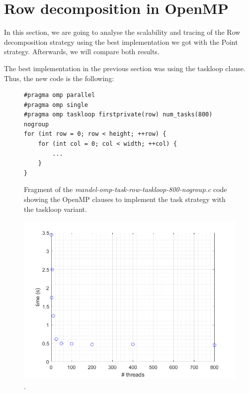 \documentclass[12pt, a4paper]{article}
\begin{document}
\section{Row decomposition in OpenMP}

In this section, we are going to analyse the scalability and tracing of the Row decomposition strategy using the best implementation we got with the Point strategy. Afterwards, we will compare both results.

The best implementation in the previous section was using the taskloop clause. Thus, the new code is the following:

\begin{figure}[H]
\begin{lstlisting}
#pragma omp parallel
#pragma omp single
#pragma omp taskloop firstprivate(row) num_tasks(800) nogroup
for (int row = 0; row < height; ++row) {
    for (int col = 0; col < width; ++col) {
        ...
	}
}
\end{lstlisting}
\caption{Fragment of the \textit{mandel-omp-task-row-taskloop-800-nogroup.c} code showing the OpenMP clauses to implement the task strategy with the taskloop variant.}
\label{code:task_implementation_row_taskloop_800}
\end{figure}

\begin{figure}[H]
  \centering
  \includegraphics[scale=0.5]{./num_task_row}
  \caption{.}
  \label{fig:num_task_row}
\end{figure}

\end{document}
